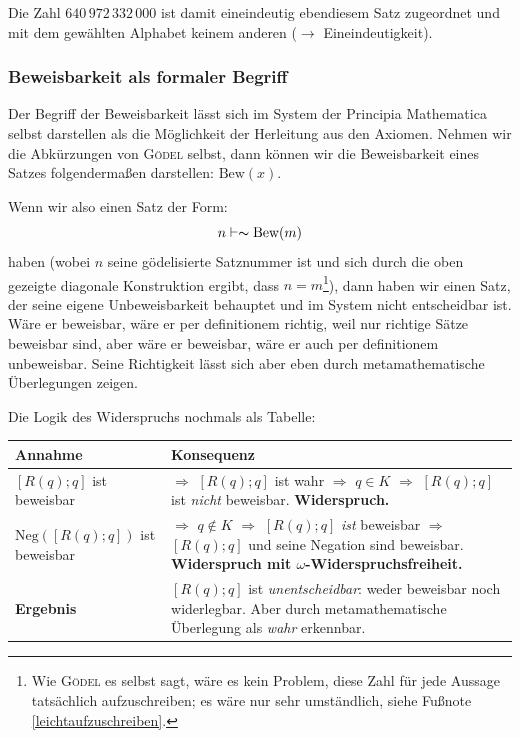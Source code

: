 Die Zahl $640\,972\,332\,000$ ist damit eineindeutig ebendiesem Satz zugeordnet und mit dem
gewählten Alphabet keinem anderen ($\longrightarrow$ Eineindeutigkeit).

\subsubsection*{Beweisbarkeit als formaler Begriff}

Der Begriff der Beweisbarkeit
lässt sich im System der Principia Mathematica selbst
darstellen als die Möglichkeit der Herleitung aus den Axiomen. Nehmen wir die Abkürzungen
von \textsc{Gödel} selbst, dann können wir die Beweisbarkeit eines Satzes folgendermaßen
darstellen: $\text{Bew}\left(x\right)$.

Wenn wir also einen Satz der Form:
$$
n \vdash \thicksim \text{Bew}\left(m\right)
$$
haben (wobei $n$ seine gödelisierte Satznummer ist und sich durch die oben gezeigte
diagonale Konstruktion ergibt, dass $n = m$\footnote{Wie \textsc{Gödel} es selbst sagt, wäre es kein
Problem, diese Zahl für jede Aussage tatsächlich
aufzuschreiben; es wäre nur sehr umständlich,
siehe Fußnote \ref{leichtaufzuschreiben}.}),
dann haben wir einen Satz, der seine eigene Unbeweisbarkeit
behauptet und im System nicht entscheidbar ist. Wäre er beweisbar, wäre er per definitionem
richtig, weil nur richtige Sätze beweisbar sind, aber wäre er beweisbar, wäre er auch
per definitionem unbeweisbar. Seine Richtigkeit lässt sich aber eben durch
metamathematische Überlegungen zeigen.

Die Logik des Widerspruchs nochmals als Tabelle:

\begin{center}
\begin{tabular}{lp{6cm}}
	\textbf{Annahme} & \textbf{Konsequenz} \\
	\hline
	$[R(q); q]$ ist beweisbar & $\Longrightarrow$ $[R(q); q]$ ist wahr
		$\Longrightarrow$ $q \in K$
		$\Longrightarrow$ $[R(q); q]$ ist \textit{nicht} beweisbar. \textbf{Widerspruch.} \\[0.5em]
	$\text{Neg}([R(q); q])$ ist beweisbar & $\Longrightarrow$ $q \notin K$
		$\Longrightarrow$ $[R(q); q]$ \textit{ist} beweisbar
		$\Longrightarrow$ $[R(q); q]$ und seine Negation sind beweisbar. \textbf{Widerspruch mit $\omega$-Widerspruchsfreiheit.} \\[0.5em]
	\hline
	\textbf{Ergebnis} & $[R(q); q]$ ist \textit{unentscheidbar}: weder beweisbar noch widerlegbar. Aber durch metamathematische Überlegung als \textit{wahr} erkennbar. \\
\end{tabular}
\end{center}

